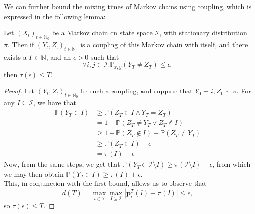 		We can further bound the mixing times of Markov chains using coupling, which
		is expressed in  the following lemma:
		\begin{lemma}
			Let $(X_t)_{t\in\mathbb{N}_0}$ be a Markov chain on state space $\mathcal
			{I}$, with stationary distribution $\pi$. Then if $(Y_t,Z_t)_{t\in
			\mathbb{N}_0}$ is a coupling of this Markov
			chain with itself, and there exists a $T\in\mathbb{N}$, and an $\epsilon>0$
			such that
			$$
				\forall i,j \in \mathcal{I}.
				\mathbb{P}_{x,y}(Y_T \neq Z_T) \leq \epsilon,
			$$
			then $\tau(\epsilon) \leq T$.
		\end{lemma}
		\begin{proof}
			Let $(Y_t, Z_t)_{t\in\mathbb{N}_0}$ be such a coupling, and suppose that
			$Y_0 = i, Z_0 \sim \pi$. For any $I \subseteq \mathcal{I}$, we have that
			\begin{align*}
				\mathbb{P}(Y_T \in I) &\geq \mathbb{P}(Z_T \in I \land Y_T=Z_T) \\
				&= 1 - \mathbb{P}(Z_T \neq Y_T \lor Z_T \notin I) \\
				&\geq 1 - \mathbb{P}(Z_T\notin I) - \mathbb{P}(Z_T \neq Y_T) \\
				&\geq \mathbb{P}(Z_T \in I) - \epsilon \\
				&= \pi(I) - \epsilon
			\end{align*}
			Now, from the same steps, we get that $\mathbb{P}(Y_T\in\mathcal{I}
			\setminus I) \geq \pi(\mathcal{I}  \setminus I) - \epsilon$, from which we 
			may then obtain $\mathbb{P}(Y_T \in I) \geq \pi(I) + \epsilon$.\\
			This, in conjunction with the first bound, allows us to observe that
			$$
				d(T) = \max_{i\in \mathcal{I}}\max_{I\subseteq\mathcal{I}} 
				|\mathbf{p}^T_i(I)-\pi(I)| \leq \epsilon,
			$$ 
			so $\tau(\epsilon) \leq T$.
		\end{proof}
